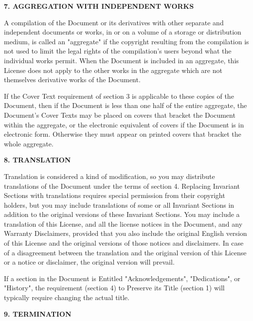 \begin{center}
{\Large\bf 7. AGGREGATION WITH INDEPENDENT WORKS}
\end{center}


A compilation of the Document or its derivatives with other separate
and independent documents or works, in or on a volume of a storage or
distribution medium, is called an "aggregate" if the copyright
resulting from the compilation is not used to limit the legal rights
of the compilation's users beyond what the individual works permit.
When the Document is included in an aggregate, this License does not
apply to the other works in the aggregate which are not themselves
derivative works of the Document.

If the Cover Text requirement of section 3 is applicable to these
copies of the Document, then if the Document is less than one half of
the entire aggregate, the Document's Cover Texts may be placed on
covers that bracket the Document within the aggregate, or the
electronic equivalent of covers if the Document is in electronic form.
Otherwise they must appear on printed covers that bracket the whole
aggregate.


\begin{center}
{\Large\bf 8. TRANSLATION}
\end{center}


Translation is considered a kind of modification, so you may
distribute translations of the Document under the terms of section 4.
Replacing Invariant Sections with translations requires special
permission from their copyright holders, but you may include
translations of some or all Invariant Sections in addition to the
original versions of these Invariant Sections.  You may include a
translation of this License, and all the license notices in the
Document, and any Warranty Disclaimers, provided that you also include
the original English version of this License and the original versions
of those notices and disclaimers.  In case of a disagreement between
the translation and the original version of this License or a notice
or disclaimer, the original version will prevail.

If a section in the Document is Entitled "Acknowledgements",
"Dedications", or "History", the requirement (section 4) to Preserve
its Title (section 1) will typically require changing the actual
title.


\begin{center}
{\Large\bf 9. TERMINATION}
\end{center}


